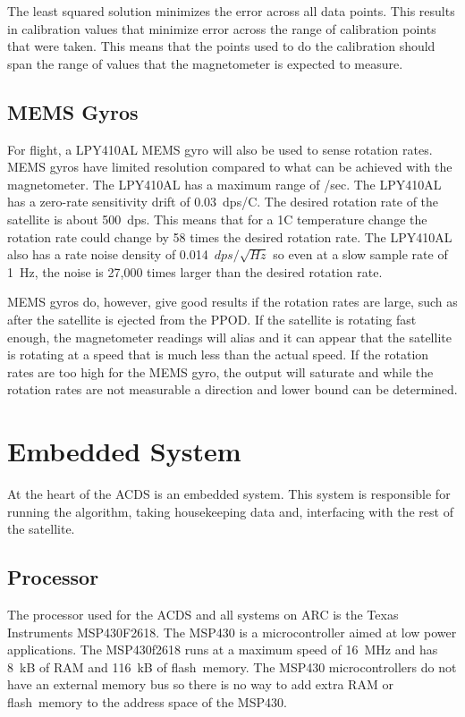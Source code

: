 The least squared solution minimizes the error across all data points. This results in calibration values that minimize error across the range of calibration points that were taken. This means that the points used to do the calibration should span the range of values that the magnetometer is expected to measure. 

\subsection{\acs{MEMS} Gyros}

For flight, a LPY410AL \ac{MEMS} gyro will also be used to sense rotation rates. \ac{MEMS} gyros have limited resolution compared to what can be achieved with the magnetometer. The LPY410AL has a maximum range of \textdegree /sec. The LPY410AL has a zero-rate sensitivity drift of 0.03~dps/\textdegree C. The desired rotation rate of the satellite is about 500~\textmu dps. This means that for a 1\textdegree C temperature change the rotation rate could change by 58 times the desired rotation rate. The LPY410AL also has a rate noise density of 0.014~$\unit{dps}{/}\sqrt{\unit{Hz}}$ so even at a slow sample rate of 1~Hz, the noise is 27,000 times larger than the desired rotation rate.

\ac{MEMS} gyros do, however, give good results if the rotation rates are large, such as after the satellite is ejected from the \ac{PPOD}. If the satellite is rotating fast enough, the magnetometer readings will alias and it can appear that the satellite is rotating at a speed that is much less than the actual speed. If the rotation rates are too high for the \ac{MEMS} gyro, the output will saturate and while the rotation rates are not measurable a direction and lower bound can be determined.


\section{Embedded System}

At the heart of the \ac{ACDS} is an embedded system. This system is responsible for running the algorithm, taking housekeeping data and, interfacing with the rest of the satellite.

\subsection{Processor}

The processor used for the \ac{ACDS} and all systems on \ac{ARC} is the Texas Instruments MSP430F2618. The MSP430 is a microcontroller aimed at low power applications. The MSP430f2618 runs at a maximum speed of 16~MHz and has 8~kB of \ac{RAM} and 116~kB of flash~memory. The MSP430 microcontrollers do not have an external memory bus so there is no way to add extra \ac{RAM} or flash~memory to the address space of the MSP430.

